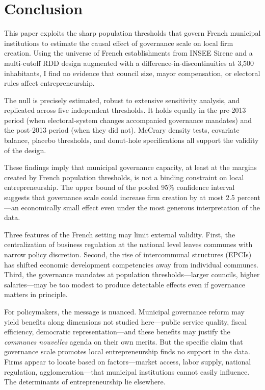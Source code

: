 \documentclass[12pt]{article}
\begin{document}
\section{Conclusion}

This paper exploits the sharp population thresholds that govern French municipal institutions to estimate the causal effect of governance scale on local firm creation. Using the universe of French establishments from INSEE Sirene and a multi-cutoff RDD design augmented with a difference-in-discontinuities at 3,500 inhabitants, I find no evidence that council size, mayor compensation, or electoral rules affect entrepreneurship.

The null is precisely estimated, robust to extensive sensitivity analysis, and replicated across five independent thresholds. It holds equally in the pre-2013 period (when electoral-system changes accompanied governance mandates) and the post-2013 period (when they did not). McCrary density tests, covariate balance, placebo thresholds, and donut-hole specifications all support the validity of the design.

These findings imply that municipal governance capacity, at least at the margins created by French population thresholds, is not a binding constraint on local entrepreneurship. The upper bound of the pooled 95\% confidence interval suggests that governance scale could increase firm creation by at most 2.5 percent---an economically small effect even under the most generous interpretation of the data.

Three features of the French setting may limit external validity. First, the centralization of business regulation at the national level leaves communes with narrow policy discretion. Second, the rise of intercommunal structures (EPCIs) has shifted economic development competencies away from individual communes. Third, the governance mandates at population thresholds---larger councils, higher salaries---may be too modest to produce detectable effects even if governance matters in principle.

For policymakers, the message is nuanced. Municipal governance reform may yield benefits along dimensions not studied here---public service quality, fiscal efficiency, democratic representation---and these benefits may justify the \textit{communes nouvelles} agenda on their own merits. But the specific claim that governance scale promotes local entrepreneurship finds no support in the data. Firms appear to locate based on factors---market access, labor supply, national regulation, agglomeration---that municipal institutions cannot easily influence. The determinants of entrepreneurship lie elsewhere.
\end{document}
